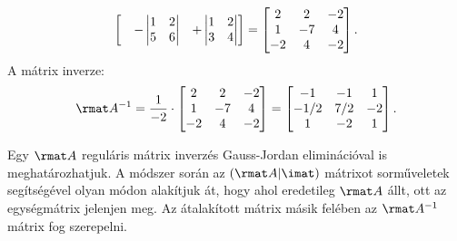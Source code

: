 \documentclass[a4paper, 12pt]{scrartcl}
\begin{document}
\begin{example}
$$\begin{bmatrix}
       &
      - \begin{vmatrix}
          1 & 2 \\
          5 & 6
        \end{vmatrix}
       &
      + \begin{vmatrix}
          1 & 2 \\
          3 & 4
        \end{vmatrix}
    \end{bmatrix}
    =
    \begin{bmatrix}
      2  & 2  & -2 \\
      1  & -7 & 4  \\
      -2 & 4  & -2
    \end{bmatrix}
    \text.
  $$
  A mátrix inverze:
  $$
    \rmat A^{-1} = \frac{1}{-2} \cdot \begin{bmatrix}
      2  & 2  & -2 \\
      1  & -7 & 4  \\
      -2 & 4  & -2
    \end{bmatrix}
    = \begin{bmatrix}
      -1   & -1  & 1  \\
      -1/2 & 7/2 & -2 \\
      1    & -2  & 1
    \end{bmatrix}
    \text.
  $$
\end{example}

\begin{blueBox}

  Egy $\rmat A$ reguláris mátrix inverzés Gauss-Jordan eliminációval
  is meghatározhatjuk. A módszer során az $(\rmat A | \imat)$ mátrixot
  sorműveletek segítségével olyan módon alakítjuk át, hogy ahol eredetileg
  $\rmat A$ állt, ott az egységmátrix jelenjen meg. Az átalakított mátrix
  másik felében az $\rmat A^{-1}$ mátrix fog szerepelni.
\end{blueBox}
\end{document}

